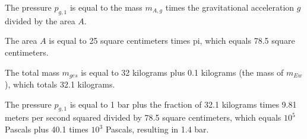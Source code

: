 The pressure \( p_{g,1} \) is equal to the mass \( m_{A,g} \) times the gravitational acceleration \( g \) divided by the area \( A \).

The area \( A \) is equal to 25 square centimeters times pi, which equals 78.5 square centimeters.

The total mass \( m_{ges} \) is equal to 32 kilograms plus 0.1 kilograms (the mass of \( m_{Ew} \)), which totals 32.1 kilograms.

The pressure \( p_{g,1} \) is equal to 1 bar plus the fraction of 32.1 kilograms times 9.81 meters per second squared divided by 78.5 square centimeters, which equals \( 10^5 \) Pascals plus 40.1 times \( 10^3 \) Pascals, resulting in 1.4 bar.